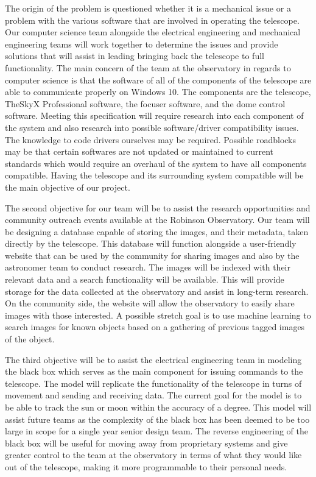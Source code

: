 \documentclass[12pt]{report}
\begin{document}
The origin of the problem is questioned whether it is a mechanical issue or a problem with the various software that are involved in operating the telescope.  Our computer science team alongside the electrical engineering and mechanical engineering teams will work together to determine the issues and provide solutions that will assist in leading bringing back the telescope to full functionality.  The main concern of the team at the observatory in regards to computer science is that the software of all of the components of the telescope are able to communicate properly on Windows 10.  The components are the telescope, TheSkyX Professional software, the focuser software, and the dome control software.  Meeting this specification will require research into each component of the system and also research into possible software/driver compatibility issues.  The knowledge to code drivers ourselves may be required.  Possible roadblocks may be that certain softwares are not updated or maintained to current standards which would require an overhaul of the system to have all components compatible.  Having the telescope and its surrounding system compatible will be the main objective of our project.

The second objective for our team will be to assist the research opportunities  and community outreach events available at the Robinson Observatory.  Our team will be designing a database capable of storing the images, and their metadata, taken directly by the telescope.  This database will function alongside a user-friendly website that can be used by the community for sharing images and also by the astronomer team to conduct research.  The images will be indexed with their relevant data and a search functionality will be available.  This will provide storage for the data collected at the observatory and assist in long-term research.  On the community side, the website will allow the observatory to easily share images with those interested.  A possible stretch goal is to use machine learning to search images for known objects based on a gathering of previous tagged images of the object.

The third objective will be to assist the electrical engineering team in modeling the black box which serves as the main component for issuing commands to the telescope.  The model will replicate the functionality of the telescope in turns of movement and sending and receiving data.  The current goal for the model is to be able to track the sun or moon within the accuracy of a degree.  This model will assist future teams as the complexity of the black box has been deemed to be too large in scope for a single year senior design team.  The reverse engineering of the black box will be useful for moving away from proprietary systems and give greater control to the team at the observatory in terms of what they would like out of the telescope, making it more programmable to their personal needs.
\end{document}
